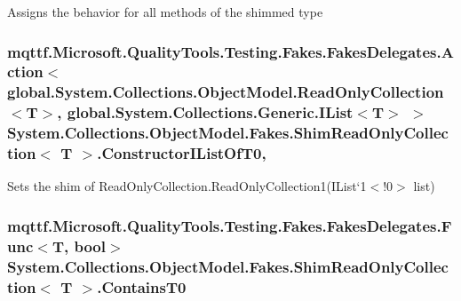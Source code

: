 Assigns the behavior for all methods of the shimmed type

\hypertarget{class_system_1_1_collections_1_1_object_model_1_1_fakes_1_1_shim_read_only_collection_3_01_t_01_4_a86463206313af50f1d187b2c6cbd6a85}{
\subsubsection[{Constructor\-I\-List\-Of\-T0}]{\setlength{\rightskip}{0pt plus 5cm}mqttf.\-Microsoft.\-Quality\-Tools.\-Testing.\-Fakes.\-Fakes\-Delegates.\-Action$<$global.\-System.\-Collections.\-Object\-Model.\-Read\-Only\-Collection$<$T$>$, global.\-System.\-Collections.\-Generic.\-I\-List$<$T$>$ $>$ System.\-Collections.\-Object\-Model.\-Fakes.\-Shim\-Read\-Only\-Collection$<$ T $>$.Constructor\-I\-List\-Of\-T0\hspace{0.3cm}{\ttfamily [static]}, {\ttfamily [set]}}}\label{class_system_1_1_collections_1_1_object_model_1_1_fakes_1_1_shim_read_only_collection_3_01_t_01_4_a86463206313af50f1d187b2c6cbd6a85}


Sets the shim of Read\-Only\-Collection{.\-Read\-Only\-Collection}1(I\-List`1$<$!0$>$ list)

\hypertarget{class_system_1_1_collections_1_1_object_model_1_1_fakes_1_1_shim_read_only_collection_3_01_t_01_4_aef45a9e906e9fe94d886f05bf2aeb6ab}{
\subsubsection[{Contains\-T0}]{\setlength{\rightskip}{0pt plus 5cm}mqttf.\-Microsoft.\-Quality\-Tools.\-Testing.\-Fakes.\-Fakes\-Delegates.\-Func$<$T, bool$>$ System.\-Collections.\-Object\-Model.\-Fakes.\-Shim\-Read\-Only\-Collection$<$ T $>$.Contains\-T0\hspace{0.3cm}{\ttfamily [set]}}}\label{class_system_1_1_collections_1_1_object_model_1_1_fakes_1_1_shim_read_only_collection_3_01_t_01_4_aef45a9e906e9fe94d886f05bf2aeb6ab}


